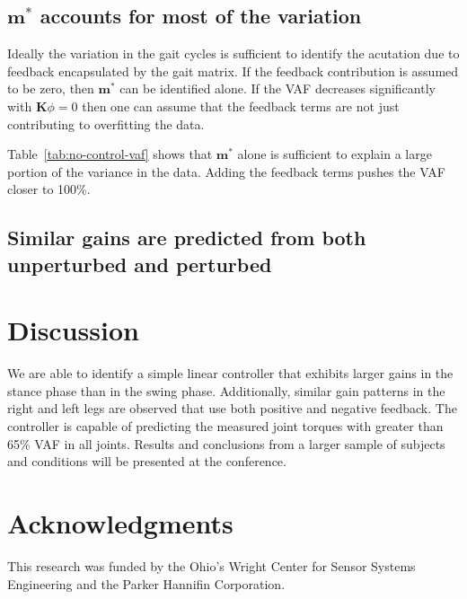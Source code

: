 \documentclass{article}
\begin{document}
\subsection*{$\mathbf{m}^*$ accounts for most of the variation}
%
Ideally the variation in the gait cycles is sufficient to identify the
acutation due to feedback encapsulated by the gait matrix. If the feedback
contribution is assumed to be zero, then $\mathbf{m}^*$ can be identified
alone. If the VAF decreases significantly with $\mathbf{K}{\phi}=0$ then one
can assume that the feedback terms are not just contributing to overfitting the
data.
%
\begin{table}
  \cprotect\caption{Generated by \verb|src/table_no_control_vaf_comparison.py|.}
  \centering
  
  \label{tab:no-control-vaf}
\end{table}

Table~\ref{tab:no-control-vaf} shows that $\mathbf{m}^*$ alone is sufficient to
explain a large portion of the variance in the data. Adding the feedback terms
pushes the VAF closer to 100\%.

\subsection*{Similar gains are predicted from both unperturbed and perturbed}
%

\section*{Discussion}
%
We are able to identify a simple linear controller that exhibits larger gains
in the stance phase than in the swing phase. Additionally, similar gain
patterns in the right and left legs are observed that use both positive and
negative feedback. The controller is capable of predicting the measured joint
torques with greater than 65\% VAF in all joints. Results and conclusions from
a larger sample of subjects and conditions will be presented at the conference.

\section*{Acknowledgments}

This research was funded by the Ohio's Wright Center for Sensor Systems
Engineering and the Parker Hannifin Corporation.
\end{document}
